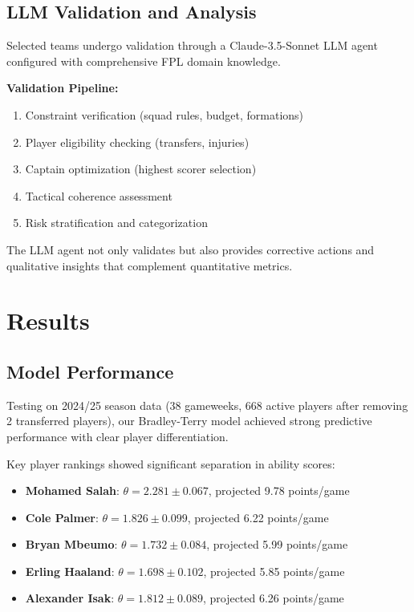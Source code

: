 \documentclass[10pt,a4paper,twocolumn]{article}
\begin{document}
\subsection*{LLM Validation and Analysis}

Selected teams undergo validation through a Claude-3.5-Sonnet LLM agent configured with comprehensive FPL domain knowledge.

\textbf{Validation Pipeline:}
\begin{enumerate}
\item Constraint verification (squad rules, budget, formations)
\item Player eligibility checking (transfers, injuries)
\item Captain optimization (highest scorer selection)
\item Tactical coherence assessment
\item Risk stratification and categorization
\end{enumerate}

The LLM agent not only validates but also provides corrective actions and qualitative insights that complement quantitative metrics.

\section*{Results}

\subsection*{Model Performance}

Testing on 2024/25 season data (38 gameweeks, 668 active players after removing 2 transferred players), our Bradley-Terry model achieved strong predictive performance with clear player differentiation.



Key player rankings showed significant separation in ability scores:

\begin{itemize}
\item \textbf{Mohamed Salah}: $\theta = 2.281 \pm 0.067$, projected 9.78 points/game
\item \textbf{Cole Palmer}: $\theta = 1.826 \pm 0.099$, projected 6.22 points/game  
\item \textbf{Bryan Mbeumo}: $\theta = 1.732 \pm 0.084$, projected 5.99 points/game
\item \textbf{Erling Haaland}: $\theta = 1.698 \pm 0.102$, projected 5.85 points/game
\item \textbf{Alexander Isak}: $\theta = 1.812 \pm 0.089$, projected 6.26 points/game
\end{itemize}
\end{document}
